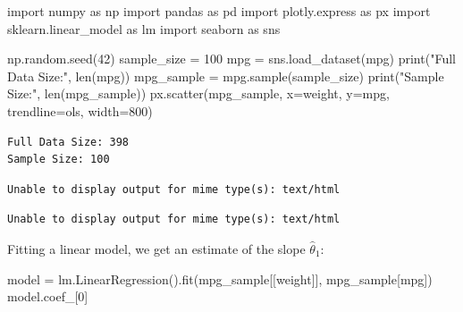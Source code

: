 \documentclass[
  letterpaper,
  DIV=11,
  numbers=noendperiod]{scrreprt}
\newenvironment{Shaded}{\begin{snugshade}}{\end{snugshade}}
\newcommand{\BuiltInTok}[1]{\textcolor[rgb]{0.00,0.23,0.31}{#1}}
\newcommand{\DecValTok}[1]{\textcolor[rgb]{0.68,0.00,0.00}{#1}}
\newcommand{\ImportTok}[1]{\textcolor[rgb]{0.00,0.46,0.62}{#1}}
\newcommand{\NormalTok}[1]{\textcolor[rgb]{0.00,0.23,0.31}{#1}}
\newcommand{\OperatorTok}[1]{\textcolor[rgb]{0.37,0.37,0.37}{#1}}
\newcommand{\StringTok}[1]{\textcolor[rgb]{0.13,0.47,0.30}{#1}}
\begin{document}
\begin{Shaded}
\begin{Highlighting}[]
\ImportTok{import}\NormalTok{ numpy }\ImportTok{as}\NormalTok{ np}
\ImportTok{import}\NormalTok{ pandas }\ImportTok{as}\NormalTok{ pd}
\ImportTok{import}\NormalTok{ plotly.express }\ImportTok{as}\NormalTok{ px}
\ImportTok{import}\NormalTok{ sklearn.linear\_model }\ImportTok{as}\NormalTok{ lm}
\ImportTok{import}\NormalTok{ seaborn }\ImportTok{as}\NormalTok{ sns}

\NormalTok{np.random.seed(}\DecValTok{42}\NormalTok{)}
\NormalTok{sample\_size }\OperatorTok{=} \DecValTok{100}
\NormalTok{mpg }\OperatorTok{=}\NormalTok{ sns.load\_dataset(}\StringTok{\textquotesingle{}mpg\textquotesingle{}}\NormalTok{)}
\BuiltInTok{print}\NormalTok{(}\StringTok{"Full Data Size:"}\NormalTok{, }\BuiltInTok{len}\NormalTok{(mpg))}
\NormalTok{mpg\_sample }\OperatorTok{=}\NormalTok{ mpg.sample(sample\_size)}
\BuiltInTok{print}\NormalTok{(}\StringTok{"Sample Size:"}\NormalTok{, }\BuiltInTok{len}\NormalTok{(mpg\_sample))}
\NormalTok{px.scatter(mpg\_sample, x}\OperatorTok{=}\StringTok{\textquotesingle{}weight\textquotesingle{}}\NormalTok{, y}\OperatorTok{=}\StringTok{\textquotesingle{}mpg\textquotesingle{}}\NormalTok{, trendline}\OperatorTok{=}\StringTok{\textquotesingle{}ols\textquotesingle{}}\NormalTok{, width}\OperatorTok{=}\DecValTok{800}\NormalTok{)}
\end{Highlighting}
\end{Shaded}

\begin{verbatim}
Full Data Size: 398
Sample Size: 100
\end{verbatim}

\begin{verbatim}
Unable to display output for mime type(s): text/html
\end{verbatim}

\begin{verbatim}
Unable to display output for mime type(s): text/html
\end{verbatim}

Fitting a linear model, we get an estimate of the slope
\(\hat{\theta}_1\):

\begin{Shaded}
\begin{Highlighting}[]
\NormalTok{model }\OperatorTok{=}\NormalTok{ lm.LinearRegression().fit(mpg\_sample[[}\StringTok{\textquotesingle{}weight\textquotesingle{}}\NormalTok{]], mpg\_sample[}\StringTok{\textquotesingle{}mpg\textquotesingle{}}\NormalTok{])}
\NormalTok{model.coef\_[}\DecValTok{0}\NormalTok{] }
\end{Highlighting}
\end{Shaded}
\end{document}
